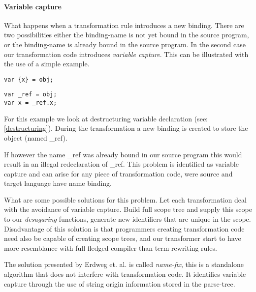 \paragraph{Variable capture}
What happens when a transformation rule introduces a new binding. There are two possibilities either the binding-name is not yet bound in the source program, or the binding-name is already bound in the source program. In the second case our transformation code introduces \textit{variable capture}. This can be illustrated with the use of a simple example.

\begin{minipage}{0.45\textwidth}
\begin{lstlisting}[caption=Input JavaScript]
var {x} = obj;
\end{lstlisting}
\end{minipage}
\hfill
\begin{minipage}{0.45\textwidth}
\begin{lstlisting}[caption=Desugared JavaScript]
var _ref = obj;
var x = _ref.x;
\end{lstlisting}
\end{minipage}

For this example we look at destructuring variable declaration (see: \ref{destructuring}). During the transformation a new binding is created to store the object (named \_ref). 

If however the name \_ref was already bound in our source program this would result in an illegal redeclaration of \_ref. This problem is identified as variable capture and can arise for any piece of transformation code, were source and target language have name binding.

What are some possible solutions for this problem. Let each transformation deal with the avoidance of variable capture. Build full scope tree and supply this scope to our \textit{desugaring} functions, generate new identifiers that are unique in the scope. Disadvantage of this solution is that programmers creating transformation code need also be capable of creating scope trees, and our transformer start to have more resemblance with full fledged compiler than term-rewriting rules.

The solution presented by Erdweg et. al.\cite{Erdweg2014a} is called \textit{name-fix}, this is a standalone algorithm that does not interfere with transformation code. It identifies variable capture through the use of string origin\cite{Inostroza2014} information stored in the parse-tree.

